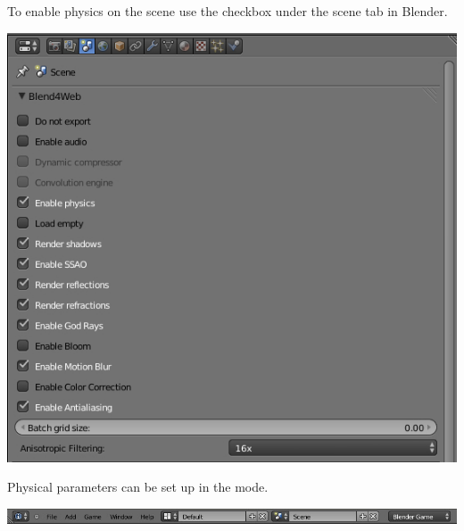 \documentclass[a4paper,12pt,oneside]{sphinxmanual}
\begin{document}
To enable physics on the scene use the  checkbox under the scene tab in Blender.

\includegraphics[width=1.000\linewidth]{scene.jpg}

\begin{DUlineblock}{0em}
\item[] 
\end{DUlineblock}

Physical parameters can be set up in the  mode.

\includegraphics[width=1.000\linewidth]{info_panel.jpg}

\begin{DUlineblock}{0em}
\item[] 
\end{DUlineblock}
\end{document}
